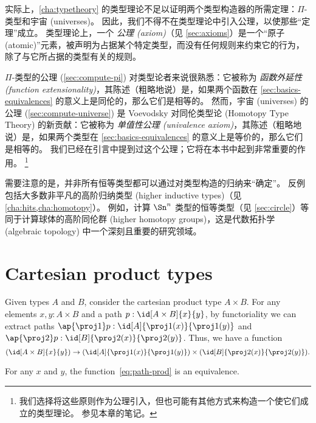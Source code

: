 实际上，\cref{cha:typetheory} 的类型理论不足以证明两个类型构造器的所需定理：$\Pi$-类型和宇宙 (universes)。
因此，我们不得不在类型理论中引入公理，以使那些``定理''成立。
类型理论上，一个 \emph{公理 (axiom)}（见 \cref{sec:axioms}）是一个``原子 (atomic)''元素，被声明为占据某个特定类型，而没有任何规则来约束它的行为，除了与它所占据的类型有关的规则。
%

%
%
$\Pi$-类型的公理 (\cref{sec:compute-pi}) 对类型论者来说很熟悉：它被称为 \emph{函数外延性 (function extensionality)}，其陈述（粗略地说）是，如果两个函数在 \cref{sec:basics-equivalences} 的意义上是同伦的，那么它们是相等的。
然而，宇宙 (universes) 的公理 (\cref{sec:compute-universe}) 是 Voevodsky 对同伦类型论 (Homotopy Type Theory) 的新贡献：它被称为 \emph{单值性公理 (univalence axiom)}，其陈述（粗略地说）是，如果两个类型在 \cref{sec:basics-equivalences} 的意义上是等价的，那么它们是相等的。
我们已经在引言中提到过这个公理；它将在本书中起到非常重要的作用。%
\footnote{我们选择将这些原则作为公理引入，但也可能有其他方式来构造一个使它们成立的类型理论。
参见本章的笔记。}

需要注意的是，并非所有恒等类型都可以通过对类型构造的归纳来``确定''。
反例包括大多数非平凡的高阶归纳类型 (higher inductive types)（见 \cref{cha:hits,cha:homotopy}）。
例如，计算 $\Sn^n$ 类型的恒等类型（见 \cref{sec:circle}）等同于计算球体的高阶同伦群 (higher homotopy groups)，这是代数拓扑学 (algebraic topology) 中一个深刻且重要的研究领域。

\section{Cartesian product types}
\label{sec:compute-cartprod}

%
Given types $A$ and $B$, consider the cartesian product type $A \times B$.
For any elements $x,y:A\times B$ and a path $p:\id[A\times B]{x}{y}$, by functoriality we can extract paths $\ap{\proj1}p:\id[A]{\proj1(x)}{\proj1(y)}$ and $\ap{\proj2}p:\id[B]{\proj2(x)}{\proj2(y)}$.
Thus, we have a function
\begin{equation}\label{eq:path-prod}
  (\id[A\times B]{x}{y}) \to (\id[A]{\proj1(x)}{\proj1(y)}) \times (\id[B]{\proj2(x)}{\proj2(y)}).
\end{equation}

\begin{thm}\label{thm:path-prod}
  For any $x$ and $y$, the function~\eqref{eq:path-prod} is an equivalence.
\end{thm}

